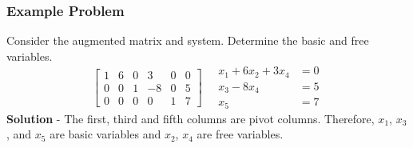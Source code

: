\subsubsection{Example Problem}
Consider the augmented matrix and system. Determine the basic and free variables.
\[
  \left[
  \begin{array}{ccccc|c}
    1 & 6 & 0 & 3 & 0 & 0 \\
    0 & 0 & 1 & -8 & 0 & 5 \\
    0 & 0 & 0 & 0 & 1 & 7
  \end{array}
  \right] \quad
  \begin{aligned}
    x_1 + 6x_2 + 3x_4 &= 0 \\
    x_3 - 8x_4 &= 5 \\
    x_5 &= 7
  \end{aligned}
\]
\textbf{Solution} -
The first, third and fifth columns are pivot columns. Therefore, $x_1$, $x_3$, and $x_5$ are basic variables and $x_2$, $x_4$ are free variables.
